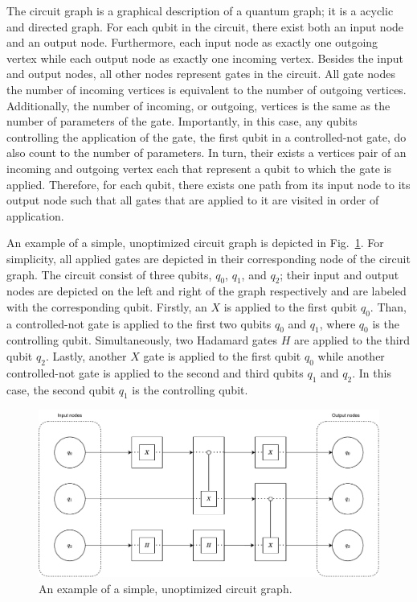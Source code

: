 The circuit graph is a graphical description of a quantum graph; it is a acyclic and directed graph. For each qubit in the circuit, there exist both an input node and an output node. Furthermore, each input node as exactly one outgoing vertex while each output node as exactly one incoming vertex. Besides the input and output nodes, all other nodes represent gates in the circuit. All gate nodes the number of incoming vertices is equivalent to the number of outgoing vertices. Additionally, the number of incoming, or outgoing, vertices is the same as the number of parameters of the gate. Importantly, in this case, any qubits controlling the application of the gate, \eg the first qubit in a controlled-not gate, do also count to the number of parameters. In turn, their exists a vertices pair of an incoming and outgoing vertex each that represent a qubit to which the gate is applied. Therefore, for each qubit, there exists one path from its input node to its output node such that all gates that are applied to it are visited in order of application.

An example of a simple, unoptimized circuit graph is depicted in Fig.~\ref{fig:circuit_graph_unoptimized}. For simplicity, all applied gates are depicted in their corresponding node of the circuit graph. The circuit consist of three qubits, $q_0$, $q_1$, and $q_2$; their input and output nodes are depicted on the left and right of the graph respectively and are labeled with the corresponding qubit. Firstly, an $X$ is applied to the first qubit $q_0$. Than, a controlled-not gate is applied to the first two qubits $q_0$ and $q_1$, where $q_0$ is the controlling qubit. Simultaneously, two Hadamard gates $H$ are applied to the third qubit $q_2$. Lastly, another $X$ gate is applied to the first qubit $q_0$ while another controlled-not gate is applied to the second and third qubits $q_1$ and $q_2$. In this case, the second qubit $q_1$ is the controlling qubit.
\begin{figure}[htp]
    \centering     
    \includegraphics[width=.9\textwidth]{../figures/circuit_graph_unoptimized.pdf}
    \caption{An example of a simple, unoptimized circuit graph.}
    \label{fig:circuit_graph_unoptimized}
\end{figure}

